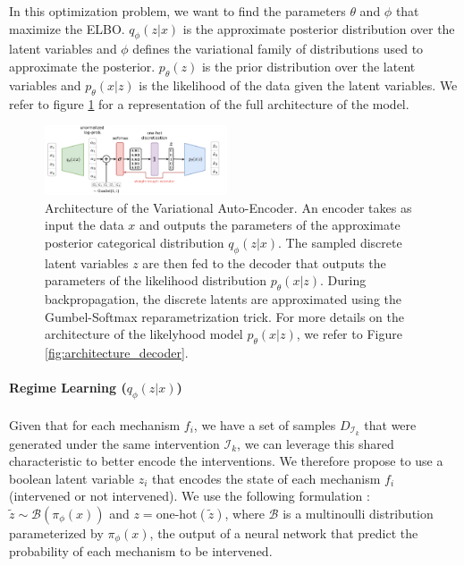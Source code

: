 \documentclass{article}
\begin{document}
In this optimization problem, we want to find the parameters $\theta$ and $\phi$ that maximize the ELBO. $q_\phi(z | x)$ is the approximate posterior distribution over the latent variables and $\phi$ defines the variational family of distributions used to approximate the posterior. $p_\theta(z)$ is the prior distribution over the latent variables and $p_\theta(x | z)$ is the likelihood of the data given the latent variables. We refer to figure \ref{fig:architecture} for a representation of the full architecture of the model.
\begin{figure}
\centering
    \includegraphics[width=0.48\textwidth]{images/architecture.pdf}
    \caption{Architecture of the Variational Auto-Encoder. An encoder takes as input the data $x$ and outputs the parameters of the approximate posterior categorical distribution $q_\phi(z | x)$. The sampled discrete latent variables $z$ are then fed to the decoder that outputs the parameters of the likelihood distribution $p_\theta(x | z)$. During backpropagation, the discrete latents are approximated using the Gumbel-Softmax reparametrization trick. For more details on the architecture of the likelyhood model $p_\theta(x | z)$, we refer to Figure \ref{fig:architecture_decoder}.}
    \label{fig:architecture}
\end{figure}
\paragraph{Regime Learning ($q_\phi(z | x)$)}Given that for each mechanism $f_i$, we have a set of samples $D_{\mathcal{I}_k}$ that were generated under the same intervention $\mathcal{I}_k$, we can leverage this shared characteristic to better encode the interventions. We therefore propose to use a boolean latent variable $z_i$ that encodes the state of each mechanism $f_i$ (intervened or not intervened). We use the following formulation : $\tilde{z} \sim \mathcal{B}(\pi_\phi(x))$ and $z = \text{one-hot}(\tilde{z})$, where $\mathcal{B}$ is a multinoulli distribution parameterized by $\pi_\phi(x)$, the output of a neural network that predict the probability of each mechanism to be intervened.
\end{document}
